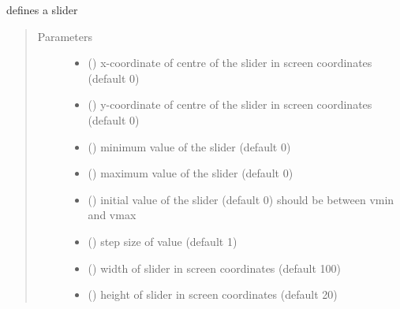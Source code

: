 \documentclass[letterpaper,10pt,english]{sphinxmanual}
\begin{document}
\begin{fulllineitems}
\label{\detokenize{Reference:salabim.AnimateSlider}}
defines a slider
\begin{quote}\begin{description}
\item[{Parameters}] \leavevmode\begin{itemize}
\item {} 
 () \textendash{} x-coordinate of centre of the slider in screen coordinates (default 0)

\item {} 
 () \textendash{} y-coordinate of centre of the slider in screen coordinates (default 0)

\item {} 
 () \textendash{} minimum value of the slider (default 0)

\item {} 
 () \textendash{} maximum value of the slider (default 0)

\item {} 
 () \textendash{} initial value of the slider (default 0) 
should be between vmin and vmax

\item {} 
 () \textendash{} step size of value (default 1)

\item {} 
 () \textendash{} width of slider in screen coordinates (default 100)

\item {} 
 () \textendash{} height of slider in screen coordinates (default 20)


\end{itemize}
\end{description}
\end{quote}
\end{fulllineitems}
\end{document}
